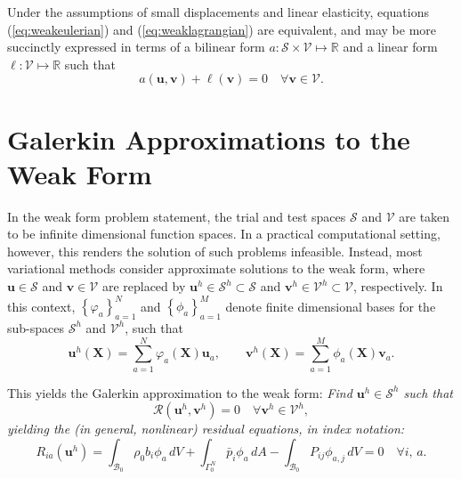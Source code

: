 Under the assumptions of small displacements and linear elasticity, equations (\ref{eq:weakeulerian}) and (\ref{eq:weaklagrangian}) are equivalent, and may be more succinctly expressed in terms of a bilinear form $a \colon \mathcal{S} \times \mathcal{V} \mapsto \mathbb{R}$ and a linear form $\ell : \mathcal{V} \mapsto \mathbb{R}$ such that
\begin{equation}
  a(\mathbf{u}, \mathbf{v}) + \ell (\mathbf{v}) = 0 \quad \forall \mathbf{v} \in \mathcal{V}.
  \label{eq:bilinear_form}
\end{equation}

\section{Galerkin Approximations to the Weak Form}

In the weak form problem statement, the trial and test spaces $\mathcal{S}$ and $\mathcal{V}$ are taken to be infinite dimensional function spaces. In a practical computational setting, however, this renders the solution of such problems infeasible. Instead, most variational methods consider approximate solutions to the weak form, where $\mathbf{u} \in \mathcal{S}$ and $\mathbf{v} \in \mathcal{V}$ are replaced by $\mathbf{u}^h \in \mathcal{S}^h \subset \mathcal{S}$ and $\mathbf{v}^h \in \mathcal{V}^h \subset \mathcal{V}$, respectively. In this context, $\left\{ \varphi_a \right\}_{a = 1}^{N}$ and $\left\{ \phi_a \right\}_{a = 1}^{M}$ denote finite dimensional bases for the sub-spaces $\mathcal{S}^h$ and $\mathcal{V}^h$, such that
\begin{equation}
  \mathbf{u}^h (\mathbf{X}) = \sum_{a = 1}^N \varphi_a (\mathbf{X}) \mathbf{u}_a, \qquad \mathbf{v}^h (\mathbf{X}) = \sum_{a = 1}^M \phi_a (\mathbf{X}) \mathbf{v}_a.
\end{equation}

This yields the Galerkin approximation to the weak form:
\textit{Find $\mathbf{u}^h \in \mathcal{S}^h$ such that}
\begin{equation}
  \mathcal{R}(\mathbf{u}^h, \mathbf{v}^h) = 0 \quad \forall \mathbf{v}^h \in \mathcal{V}^h,
  \label{eq:weakform}
\end{equation}
\textit{yielding the (in general, nonlinear) residual equations, in index notation:}
\begin{equation}
  R_{ia} (\mathbf{u}^h) = \int_{\mathcal{B}_0} \rho_0 b_i \phi_a \, dV + \int_{\Gamma^N_0} \bar{p}_i \phi_a \, dA - \int_{\mathcal{B}_0} P_{ij} \phi_{a,j} \, dV = 0 \quad \forall i, \, a.
  \label{eq:residual}
\end{equation}

